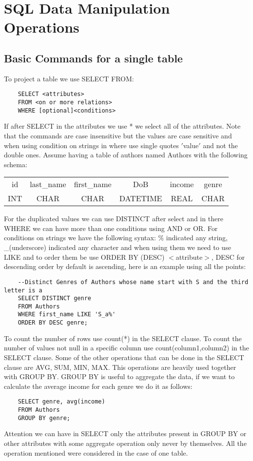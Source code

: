 \documentclass[a4page, 11pt]{article}
\begin{document}
\section{SQL Data Manipulation Operations}

\subsection{Basic Commands for a single table}
To project a table we use SELECT FROM:

\begin{lstlisting}
	SELECT <attributes>
	FROM <on or more relations>
	WHERE [optional]<conditions>
\end{lstlisting}

If after SELECT in the attributes we use * we select all of the attributes. Note that the commands are case insensitive but the values are case sensitive and when using condition on strings in where use single quotes $'$value$'$ and not the double ones.\newline
Assume having a table of authors named Authors with the following schema:
\begin{table}[h]
	\centering
	\begin{tabular}{c c c c c c}
		id & last\_name & first\_name & DoB & income & genre\\
		INT & CHAR & CHAR & DATETIME & REAL & CHAR\\
	\end{tabular}
\end{table}


For the duplicated values we can use DISTINCT after select and in there WHERE we can have more than one conditions using AND or OR.\newline
For conditions on strings we have the following syntax: \% indicated any string, \_(underscore) indicated any character and when using them we need to use LIKE and to order them be use ORDER BY (DESC) $<$attribute$>$, DESC for descending order by default is ascending, here is an example using all the points:
\pagebreak
\begin{lstlisting}
	--Distinct Genres of Authors whose name start with S and the third letter is a
	SELECT DISTINCT genre
	FROM Authors
	WHERE first_name LIKE 'S_a%'
	ORDER BY DESC genre;
\end{lstlisting}

To count the number of rows use count(*) in the SELECT clause. To count the number of values not null in a specific column use count(column1,column2) in the SELECT clause. Some of the other operations that can be done in the SELECT clause are AVG, SUM, MIN, MAX.\newline
This operations are heavily used together with GROUP BY. GROUP BY  is useful to aggregate the data, if we want to calculate the average income for each genre we do it as follows:
\begin{lstlisting}
	SELECT genre, avg(income)
	FROM Authors
	GROUP BY genre;
\end{lstlisting}
Attention we can have in SELECT only the attributes present in GROUP BY or other attributes with some aggregate operation only never by themselves. All the operation mentioned were considered in the case of one table.
\end{document}
